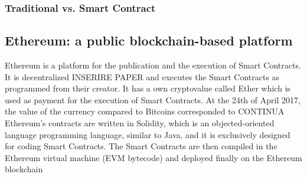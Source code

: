 \subsubsection{Traditional vs. Smart Contract}

\subsection{Ethereum: a public blockchain-based platform}
Ethereum is a platform for the publication and the execution of Smart Contracts. It is decentralized INSERIRE PAPER and executes the Smart Contracts as programmed from their creator.
It has a own cryptovalue called Ether which is used as payment for the execution of Smart Contracts.
At the 24th of April 2017, the value of the currency compared to Bitcoins corresponded to CONTINUA
Ethereum's contracts are written in Solidity, which is an objected-oriented language programming language, similar to Java, and it is exclusively designed for coding Smart Contracts.
The Smart Contracts are then compiled in the Ethereum virtual machine (EVM bytecode) and deployed finally on the Ethereum blockchain 

